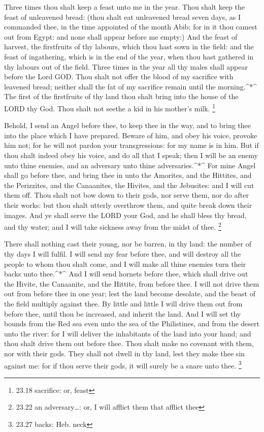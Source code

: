  Three times thou shalt keep a feast unto me in the year.
 Thou shalt keep the feast of unleavened bread: (thou shalt
eat unleavened bread seven days, as I commanded thee, in the time
appointed of the month Abib; for in it thou camest out from Egypt: and
none shall appear before me empty:)  And the feast of
harvest, the firstfruits of thy labours, which thou hast sown in the
field: and the feast of ingathering, which is in the end of the year,
when thou hast gathered in thy labours out of the field. 
Three times in the year all thy males shall appear before the Lord GOD.
 Thou shalt not offer the blood of my sacrifice with
leavened bread; neither shall the fat of my sacrifice remain until the
morning.\^{}*\^{}  The first of the firstfruits of thy land
thou shalt bring into the house of the LORD thy God. Thou shalt not
seethe a kid in his mother's milk. \footnote{23.18 sacrifice: or, feast}

 Behold, I send an Angel before thee, to keep thee in the
way, and to bring thee into the place which I have prepared.
 Beware of him, and obey his voice, provoke him not; for he
will not pardon your transgressions: for my name is in him.
 But if thou shalt indeed obey his voice, and do all that I
speak; then I will be an enemy unto thine enemies, and an adversary unto
thine adversaries.\^{}*\^{}  For mine Angel shall go before
thee, and bring thee in unto the Amorites, and the Hittites, and the
Perizzites, and the Canaanites, the Hivites, and the Jebusites: and I
will cut them off.  Thou shalt not bow down to their gods,
nor serve them, nor do after their works: but thou shalt utterly
overthrow them, and quite break down their images.  And ye
shall serve the LORD your God, and he shall bless thy bread, and thy
water; and I will take sickness away from the midst of thee. \footnote{23.22
  an adversary\ldots: or, I will afflict them that afflict thee}

 There shall nothing cast their young, nor be barren, in
thy land: the number of thy days I will fulfil.  I will
send my fear before thee, and will destroy all the people to whom thou
shalt come, and I will make all thine enemies turn their backs unto
thee.\^{}*\^{}  And I will send hornets before thee, which
shall drive out the Hivite, the Canaanite, and the Hittite, from before
thee.  I will not drive them out from before thee in one
year; lest the land become desolate, and the beast of the field multiply
against thee.  By little and little I will drive them out
from before thee, until thou be increased, and inherit the land.
 And I will set thy bounds from the Red sea even unto the
sea of the Philistines, and from the desert unto the river: for I will
deliver the inhabitants of the land into your hand; and thou shalt drive
them out before thee.  Thou shalt make no covenant with
them, nor with their gods.  They shall not dwell in thy
land, lest they make thee sin against me: for if thou serve their gods,
it will surely be a snare unto thee. \footnote{23.27 backs: Heb. neck}


